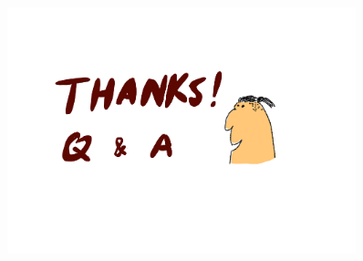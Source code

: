 \documentclass{beamer}
\begin{document}
\begin{frame}
\begin{figure}
    \centering
    \includegraphics[width=0.9\textwidth]{thanks.pdf}
\end{figure}
\end{frame}
\end{document}
